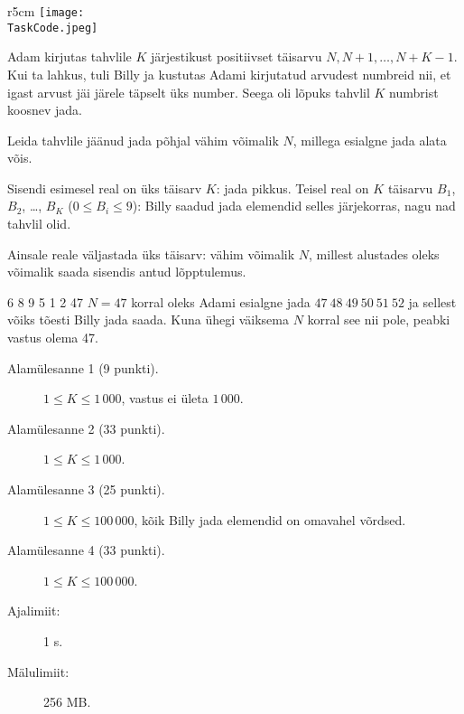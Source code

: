 \documentclass{boi2014-et}
\renewcommand{\TaskCode}{sequence}
\begin{document}
    \begin{wrapfigure}[5]{r}{5cm}
        \vspace{-24pt}
        \texttt{[image: \\TaskCode.jpeg]}
    \end{wrapfigure}

    Adam kirjutas tahvlile $K$ järjestikust positiivset täisarvu $N, N+1, \ldots, N+K-1$.
    Kui ta lahkus, tuli Billy ja kustutas Adami kirjutatud arvudest numbreid nii,
    et igast arvust jäi järele täpselt üks number.
    Seega oli lõpuks tahvlil $K$ numbrist koosnev jada.

    \Task

    Leida tahvlile jäänud jada põhjal vähim võimalik $N$, millega esialgne jada alata võis.

    \Input

    Sisendi esimesel real on üks täisarv $K$: jada pikkus.
    Teisel real on $K$ täisarvu $B_1$, $B_2$, \dots, $B_K$ ($0 \le B_i \le 9$):
    Billy saadud jada elemendid selles järjekorras, nagu nad tahvlil olid.

    \Output

    Ainsale reale väljastada üks täisarv: vähim võimalik $N$, millest alustades
    oleks võimalik saada sisendis antud lõpptulemus.

    \Example

    \example
    {
        6 8 9 5 1 2
    }
    {
        47
    }
    {
        $N = 47$ korral oleks Adami esialgne jada $47\ 48\ 49\ 50\ 51\ 52$
        ja sellest võiks tõesti Billy jada saada. Kuna ühegi väiksema
        $N$ korral see nii pole, peabki vastus olema 47.
    }

    \Scoring

    \begin{description}
        \item[Alamülesanne 1 (9 punkti).] $1 \le K \le 1\,000$,
            vastus ei ületa $1\,000$.
        \item[Alamülesanne 2 (33 punkti).] $1 \le K \le 1\,000$.
        \item[Alamülesanne 3 (25 punkti).] $1 \le K \le 100\,000$,
            kõik Billy jada elemendid on omavahel võrdsed.
        \item[Alamülesanne 4 (33 punkti).] $1 \le K \le 100\,000$.
    \end{description}

    \Constraints

    \begin{description}
        \item[Ajalimiit:] 1 s.
        \item[Mälulimiit:] 256 MB.
    \end{description}
\end{document}
